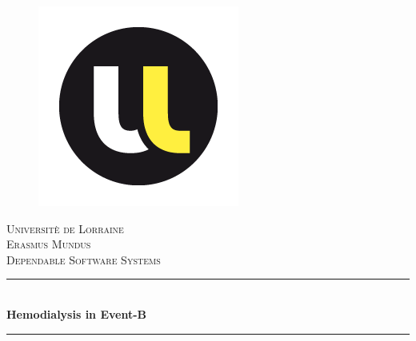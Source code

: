 \documentclass[12pt]{article}
\begin{document}
\begin{titlepage}

\newcommand{\HRule}{\rule{\linewidth}{0.5mm}} %

\center %
 
\begin{figure}
    \centering
\includegraphics{University_of_Lorraine_(logo).png}\\
\end{figure}
\textsc{\LARGE Universit\`{e} de Lorraine}\\[1cm] %

\textsc{\Large Erasmus Mundus}\\[0.5cm] %
\textsc{\large Dependable Software Systems}\\[0.5cm] %


\HRule \\[0.4cm]
{ \huge \bfseries Hemodialysis in Event-B}\\[0.4cm] %
\HRule \\[1.5cm]
 


\end{titlepage}
\end{document}
